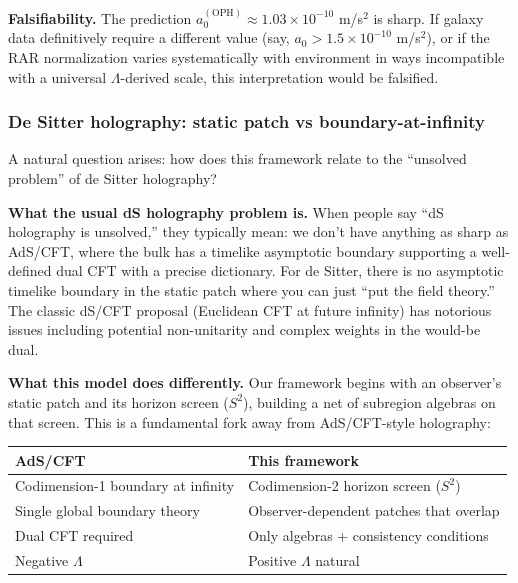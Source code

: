\documentclass[11pt,a4paper]{article}
\theoremstyle{remark}
\begin{document}
\textbf{Falsifiability.} The prediction \(a_0^{\mathrm{(OPH)}} \approx 1.03 \times
10^{-10}\) m/s\(^2\) is sharp. If galaxy data definitively require a different
value (say, \(a_0 > 1.5 \times 10^{-10}\) m/s\(^2\)), or if the RAR normalization
varies systematically with environment in ways incompatible with a universal
\(\Lambda\)-derived scale, this interpretation would be falsified.

\subsubsection{De Sitter holography: static patch vs boundary-at-infinity}\label{de-sitter-holography-static-patch-vs-boundary-at-infinity}

A natural question arises: how does this framework relate to the ``unsolved
problem'' of de Sitter holography?

\textbf{What the usual dS holography problem is.} When people say ``dS holography
is unsolved,'' they typically mean: we don't have anything as sharp as
AdS/CFT, where the bulk has a timelike asymptotic boundary supporting a
well-defined dual CFT with a precise dictionary. For de Sitter, there is no
asymptotic timelike boundary in the static patch where you can just ``put
the field theory.'' The classic dS/CFT proposal (Euclidean CFT at future
infinity) has notorious issues including potential non-unitarity and
complex weights in the would-be dual.

\textbf{What this model does differently.} Our framework begins with an
observer's static patch and its horizon screen (\(S^2\)), building a net of
subregion algebras on that screen. This is a fundamental fork away from
AdS/CFT-style holography:

{\def\LTcaptype{none} %
\begin{longtable}[]{@{}
  >{\raggedright\arraybackslash}p{}
  >{\raggedright\arraybackslash}p{}@{}}
\toprule\noalign{}
\begin{minipage}[b]{\linewidth}\raggedright
AdS/CFT
\end{minipage} & \begin{minipage}[b]{\linewidth}\raggedright
This framework
\end{minipage} \\
\midrule\noalign{}
\endhead
\bottomrule\noalign{}
\endlastfoot
Codimension-1 boundary at infinity & Codimension-2 horizon screen (\(S^2\)) \\
Single global boundary theory & Observer-dependent patches that overlap \\
Dual CFT required & Only algebras + consistency conditions \\
Negative \(\Lambda\) & Positive \(\Lambda\) natural \\
\end{longtable}
}
\end{document}

